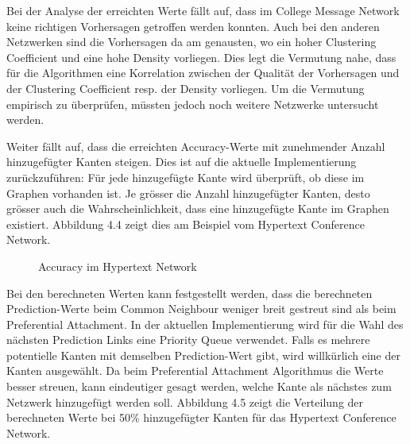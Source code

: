 Bei der Analyse der erreichten Werte fällt auf, dass im College Message Network keine richtigen Vorhersagen getroffen werden konnten.
Auch bei den anderen Netzwerken sind die Vorhersagen da am genausten, wo ein hoher Clustering Coefficient und eine hohe Density vorliegen.
Dies legt die Vermutung nahe, dass für die Algorithmen eine Korrelation zwischen der Qualität der Vorhersagen und der Clustering Coefficient resp. der Density vorliegen.
Um die Vermutung empirisch zu überprüfen, müssten jedoch noch weitere Netzwerke untersucht werden.

Weiter fällt auf, dass die erreichten Accuracy-Werte mit zunehmender Anzahl hinzugefügter Kanten steigen.
Dies ist auf die aktuelle Implementierung zurückzuführen: Für jede hinzugefügte Kante wird überprüft, ob diese im Graphen vorhanden ist.
Je grösser die Anzahl hinzugefügter Kanten, desto grösser auch die Wahrscheinlichkeit, dass eine hinzugefügte Kante im Graphen existiert.
Abbildung 4.4 zeigt dies am Beispiel vom Hypertext Conference Network. %

\vspace{5mm}
\begin{figure}[h]
\centering
{}
\label{fig:hypertext}
\caption{Accuracy im Hypertext Network}
\end{figure}

\newpage
Bei den berechneten Werten kann festgestellt werden, dass die berechneten Prediction-Werte beim Common Neighbour weniger breit gestreut sind als beim Preferential Attachment.
In der aktuellen Implementierung wird für die Wahl des nächsten Prediction Links eine Priority Queue verwendet. Falls es mehrere potentielle Kanten mit demselben Prediction-Wert gibt, wird willkürlich eine der Kanten ausgewählt.
Da beim Preferential Attachment Algorithmus die Werte besser streuen, kann eindeutiger gesagt werden, welche Kante als nächstes zum Netzwerk hinzugefügt werden soll.
Abbildung 4.5 %
zeigt die Verteilung der berechneten Werte bei 50\% hinzugefügter Kanten für das Hypertext Conference Network.

